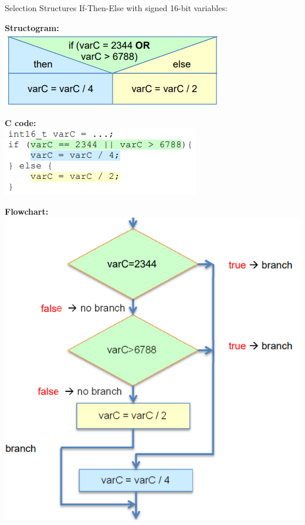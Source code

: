 \begin{example2}{Selection Structures}
If-Then-Else with signed 16-bit variables:
\vspace{2mm}\\
\begin{minipage}[t]{0.5\linewidth}
\textbf{Structogram:}\\
\includegraphics[width=\linewidth]{images/structogramex3.png}
\end{minipage}
\begin{minipage}[t]{0.48\linewidth}
\textbf{C code:}
\vspace{2mm}\\
\includegraphics[width=\linewidth]{images/ccodeex3.png}
\end{minipage}

\textbf{Flowchart:}\\
\includegraphics[width=0.7\linewidth]{images/flowchartex3.png}


\end{example2}
